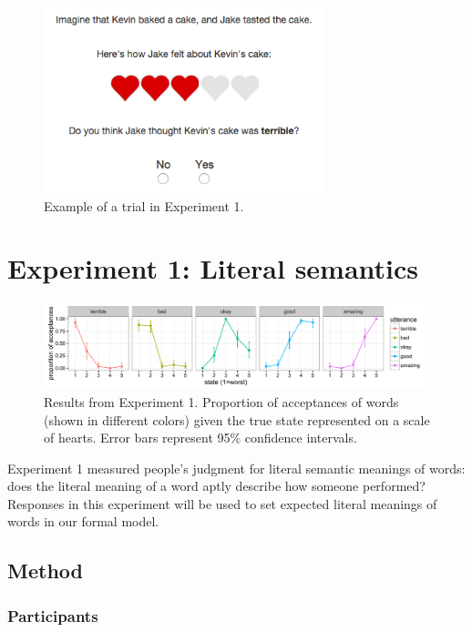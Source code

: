 \documentclass[10pt,letterpaper]{article}
\newcommand{\ndg}[1]{\textcolor{Green}{[ndg: #1]}}
\begin{document}
\begin{figure}
\begin{centering} 
\includegraphics[width=3.2in]{figures/example.png}
\caption{\label{fig:ex} Example of a trial in Experiment 1.}
\end{centering} 
\end{figure}

\section{Experiment 1: Literal semantics}
\begin{figure}[t]
\begin{center} 
  \includegraphics[width=.9\textwidth]{figures/exp1.pdf}
  \caption{\label{fig:exp1} Results from Experiment 1. Proportion of acceptances of words (shown in different colors) given the true state represented on a scale of hearts. Error bars represent 95\% confidence intervals.}
  \end{center} 
\end{figure}


Experiment 1 measured people's judgment for literal semantic meanings of words: 
does the literal meaning of a word aptly describe how someone performed?
Responses in this experiment will be used to set expected literal meanings of words in our formal model.

\subsection{Method}

\subsubsection{Participants}
\end{document}
